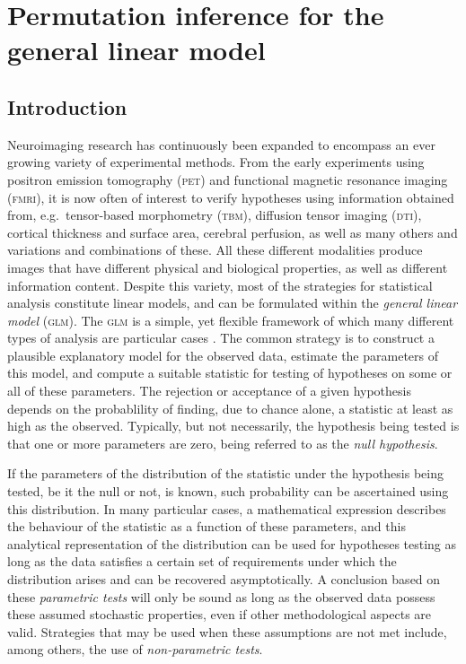 \chapter{Permutation inference for the general linear model}
\label{sec:permglm}
\setstretch{\lspac}

\section{Introduction}

Neuroimaging research has continuously been expanded to encompass an ever growing variety of experimental methods. From the early experiments using positron emission tomography (\textsc{pet}) and functional magnetic resonance imaging (\textsc{fmri}), it is now often of interest to verify hypotheses using information obtained from, e.g.\ tensor-based morphometry (\textsc{tbm}), diffusion tensor imaging (\textsc{dti}), cortical thickness and surface area, cerebral perfusion, as well as many others and variations and combinations of these. All these different modalities produce images that have different physical and biological properties, as well as different information content. Despite this variety, most of the strategies for statistical analysis constitute linear models, and can be formulated within the \emph{general linear model} (\textsc{glm}). The \textsc{glm} is a simple, yet flexible framework of which many different types of analysis are particular cases \citep{Searle1971, Christensen2002}. The common strategy is to construct a plausible explanatory model for the observed data, estimate the parameters of this model, and compute a suitable statistic for testing of hypotheses on some or all of these parameters. The rejection or acceptance of a given hypothesis depends on the probablility of finding, due to chance alone, a statistic at least as high as the observed. Typically, but not necessarily, the hypothesis being tested is that one or more parameters are zero, being referred to as the \emph{null hypothesis}.

If the parameters of the distribution of the statistic under the hypothesis being tested, be it the null or not, is known, such probability can be ascertained using this distribution. In many particular cases, a mathematical expression describes the behaviour of the statistic as a function of these parameters, and this analytical representation of the distribution can be used for hypotheses testing as long as the data satisfies a certain set of requirements under which the distribution arises and can be recovered asymptotically. A conclusion based on these \emph{parametric tests} will only be sound as long as the observed data possess these assumed stochastic properties, even if other methodological aspects are valid. Strategies that may be used when these assumptions are not met include, among others, the use of \emph{non-parametric tests}.

